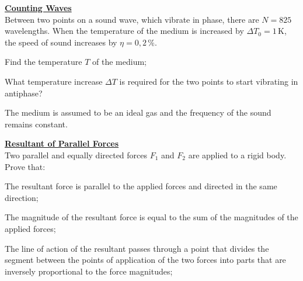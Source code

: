\documentclass[a4paper]{article}
\begin{document}
	\Problem
	\textbf{\underline{Counting Waves}}
	\\
	Between two points on a sound wave, which vibrate in phase, there are $N = 825$ wavelengths. When the temperature of the medium is increased by $\Delta T_0 = 1\,\mathrm{K}$, the speed of sound increases by $\eta = 0{,}2\,\%$. 
	\begin{description}[leftmargin=!, labelwidth=\widthof{$\bullet$}]
		\item[$\bullet$] Find the temperature $T$ of the medium;
		\item[$\bullet$] What temperature increase $\Delta T$ is required for the two points to start vibrating in antiphase?
	\end{description}
	The medium is assumed to be an ideal gas and the frequency of the sound remains constant.

	\Problem
	\textbf{\underline{Resultant of Parallel Forces}}
	\\
	Two parallel and equally directed forces $F_1$ and $F_2$ are applied to a rigid body. Prove that:
	\begin{description}[leftmargin=!, labelwidth=\widthof{$\bullet$}]
		\item[$\bullet$] The resultant force is parallel to the applied forces and directed in the same direction;
		\item[$\bullet$] The magnitude of the resultant force is equal to the sum of the magnitudes of the applied forces;
		\item[$\bullet$] The line of action of the resultant passes through a point that divides the segment between the points of application of the two forces into parts that are inversely proportional to the force magnitudes;
	\end{description}
	
\end{document}
